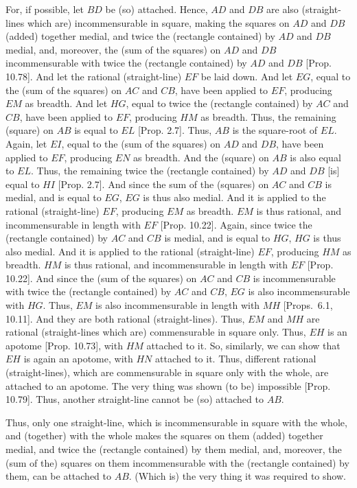 \begin{Parallel}{}{}
{For, if possible, let $BD$ be (so) attached. Hence, $AD$ and
$DB$ are also (straight-lines which are) incommensurable in square, making the
squares on $AD$ and $DB$ (added) together medial, and twice the (rectangle contained) by $AD$ and $DB$ medial, and, moreover, the (sum of the squares)
on $AD$ and $DB$ incommensurable with twice the (rectangle contained)
by $AD$ and $DB$ [Prop. 10.78].
And let the rational (straight-line) $EF$ be laid down. And let $EG$, equal
to the (sum of the squares) on $AC$ and $CB$, have been applied to
$EF$, producing $EM$ as breadth. And let $HG$, equal to twice the (rectangle contained) by $AC$ and $CB$, have been applied to $EF$, producing $HM$ as breadth. Thus, the remaining (square) on  $AB$ is equal
to $EL$ [Prop. 2.7].  Thus, $AB$ is the square-root
of $EL$. Again, let $EI$, equal to the (sum of the squares) on $AD$ and $DB$, have been applied to $EF$, producing $EN$ as breadth. And the (square) on $AB$
 is also equal to $EL$. Thus, the remaining twice the
(rectangle contained) by $AD$ and $DB$ [is] equal to $HI$ [Prop. 2.7].  And since the sum of the (squares) on $AC$ and $CB$ is medial, and is equal to $EG$, $EG$ is thus also medial.
And it is applied to the rational (straight-line) $EF$, producing $EM$ as breadth. $EM$ is thus rational, and incommensurable in length with $EF$
[Prop. 10.22]. Again, since twice the
(rectangle contained) by $AC$ and $CB$ is medial, and is equal to $HG$,
$HG$ is thus also medial. And it is applied to the rational (straight-line) $EF$,
producing $HM$ as breadth. $HM$ is thus rational, and incommensurable in
length with $EF$ [Prop. 10.22]. 
And since the (sum of the squares) on
 $AC$ and $CB$ is incommensurable
with twice the (rectangle contained) by $AC$ and $CB$, $EG$ is also incommensurable with $HG$. Thus, $EM$ is also incommensurable in length
with $MH$ [Props.~6.1, 10.11]. And they are both  rational (straight-lines). Thus, $EM$ and $MH$ are rational (straight-lines which are) commensurable in square
only. Thus, $EH$ is an apotome [Prop. 10.73], with $HM$ attached to it. So, similarly, we can show that $EH$ is again an apotome, with $HN$ attached to it. Thus, different rational (straight-lines),
which are commensurable in square only with the whole, are attached to
an apotome. The very thing was shown (to be) impossible [Prop. 10.79]. Thus, another straight-line cannot
be (so) attached to $AB$.

Thus, only one straight-line, which is incommensurable
in square with the whole, and (together) with the whole makes the 
squares on them (added) together medial, and twice the (rectangle contained) by
them medial, and, moreover, the (sum of the)
squares on them incommensurable with the (rectangle contained)
by them, can be attached to $AB$. (Which is) the very thing it
was required to show.}
\end{Parallel}


